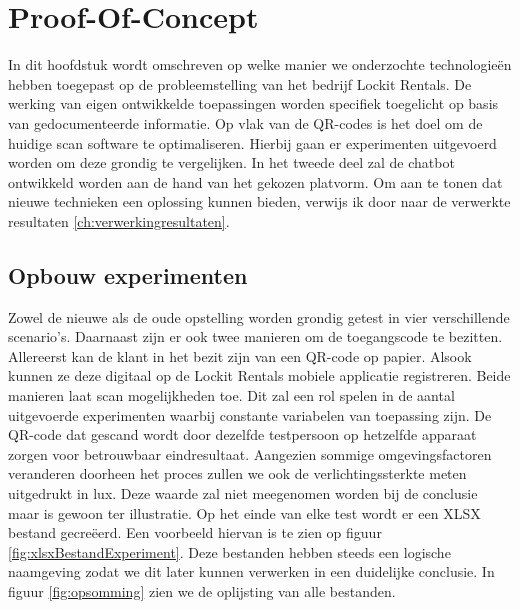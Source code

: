 

\chapter{Proof-Of-Concept}%
\label{ch:Proof-Of-Concept}


In dit hoofdstuk wordt omschreven op welke manier we onderzochte technologieën hebben toegepast op de probleemstelling van het bedrijf Lockit Rentals. De werking van eigen ontwikkelde toepassingen worden specifiek toegelicht op basis van gedocumenteerde informatie. Op vlak van de QR-codes is het doel om de huidige scan software te optimaliseren. Hierbij gaan er experimenten uitgevoerd worden om deze grondig te vergelijken. In het tweede deel zal de chatbot ontwikkeld worden aan de hand van het gekozen platvorm. Om aan te tonen dat nieuwe technieken een oplossing kunnen bieden, verwijs ik door naar de verwerkte resultaten \ref{ch:verwerkingresultaten}.

\section{Opbouw experimenten}%
\label{sec:toepassingenQR-coce scanners}

Zowel de nieuwe als de oude opstelling worden grondig getest in vier verschillende scenario’s. Daarnaast zijn er ook twee manieren om de toegangscode te bezitten. Allereerst kan de klant in het bezit zijn van een QR-code op papier. Alsook kunnen ze deze digitaal op de Lockit Rentals mobiele applicatie registreren. Beide manieren laat scan mogelijkheden toe. Dit zal een rol spelen in de aantal uitgevoerde experimenten waarbij constante variabelen van toepassing zijn. De QR-code dat gescand wordt door dezelfde testpersoon op hetzelfde apparaat zorgen voor betrouwbaar eindresultaat. 
Aangezien sommige omgevingsfactoren veranderen doorheen het proces zullen we ook de verlichtingssterkte meten uitgedrukt in lux. Deze waarde zal niet meegenomen worden bij de conclusie maar is gewoon ter illustratie. 
Op het einde van elke test wordt er een \ac{XLSX} bestand gecreëerd. Een voorbeeld hiervan is te zien op figuur \ref{fig:xlsxBestandExperiment}. Deze bestanden hebben steeds een logische naamgeving zodat we dit later kunnen verwerken in een duidelijke conclusie. In figuur \ref{fig:opsomming} zien we de oplijsting van alle bestanden.


